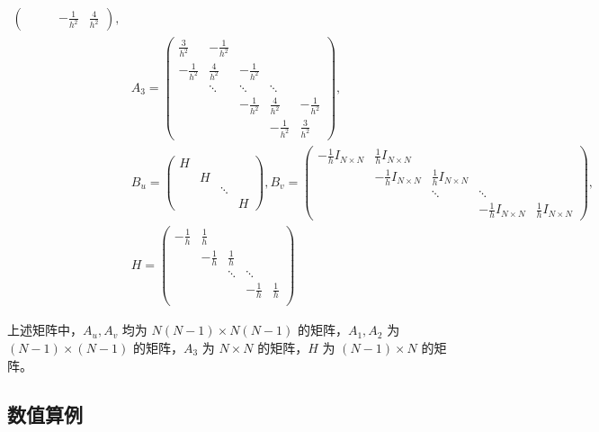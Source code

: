 \documentclass{article}
\begin{document}
\begin{equation*}
\begin{aligned}
\begin{pmatrix}
            &&& -\frac{1}{h^2} & \frac{4}{h^2}
        \end{pmatrix}, \\
        & A_3 =
        \begin{pmatrix}
            \frac{3}{h^2} & -\frac{1}{h^2} \\
            -\frac{1}{h^2} & \frac{4}{h^2} & -\frac{1}{h^2} \\
            & \ddots & \ddots &\ddots \\
            && -\frac{1}{h^2} & \frac{4}{h^2} & -\frac{1}{h^2} \\
            &&& -\frac{1}{h^2} & \frac{3}{h^2}
        \end{pmatrix}, \\
        & B_u =
        \begin{pmatrix}
            H \\
            & H \\
            & & \ddots \\
            & & & H
        \end{pmatrix},
        B_v =
        \begin{pmatrix}
            -\frac{1}{h} I_{N\times N} & \frac{1}{h} I_{N\times N} \\
            & -\frac{1}{h} I_{N\times N} & \frac{1}{h} I_{N\times N} \\
            & & \ddots & \ddots \\
            & & & -\frac{1}{h} I_{N\times N} & \frac{1}{h} I_{N\times N}
        \end{pmatrix}, \\
        & H =
        \begin{pmatrix}
            -\frac{1}{h} & \frac{1}{h}\\
            & -\frac{1}{h} & \frac{1}{h} \\
            & & \ddots & \ddots \\
            & & & -\frac{1}{h} & \frac{1}{h} \\
        \end{pmatrix}
    \end{aligned}
\end{equation*}

上述矩阵中，$A_u,A_v$ 均为 $N(N-1)\times N(N-1)$ 的矩阵，$A_1, A_2$ 为 $(N-1)\times(N-1)$ 的矩阵，$A_3$ 为 $N\times N$ 的矩阵，$H$ 为 $(N-1)\times N$ 的矩阵。

\subsection{数值算例}
\end{document}
